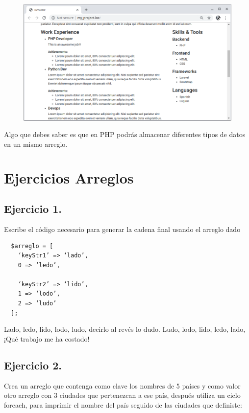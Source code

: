 \documentclass{article}
\begin{document}
\begin{figure}[h!]
  \centering
  \includegraphics[scale=0.5]{./Pictures/020_array_array.png}
\end{figure}

Algo que debes saber es que en PHP podrás almacenar diferentes tipos de datos
en un mismo arreglo.\\

\newpage

\section{Ejercicios Arreglos}%
\subsection*{Ejercicio 1.}%
Escribe el código necesario para generar la cadena final usando el arreglo dado\\
\begin{verbatim}
  $arreglo = [
    ‘keyStr1’ => ‘lado’,
    0 => ‘ledo’,

    ‘keyStr2’ => ‘lido’,
    1 => ‘lodo’,
    2 => ‘ludo’
  ];
\end{verbatim}

Lado, ledo, lido, lodo, ludo,
decirlo al revés lo dudo.
Ludo, lodo, lido, ledo, lado,
¡Qué trabajo me ha costado!

\subsection*{Ejercicio 2.}%
Crea un arreglo que contenga como clave los nombres de 5 países y como valor
otro arreglo con 3 ciudades que pertenezcan a ese país, después utiliza un
ciclo foreach, para imprimir el nombre del país seguido de las ciudades que
definiste:\\
\end{document}
